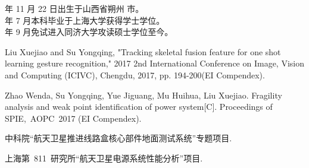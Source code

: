  年 11 月 22 日出生于山西省朔州 市。\\
 年 7 月本科毕业于上海大学获得学士学位。\\
 年 9 月免试进入同济大学攻读硕士学位至今。

\begin{enumerate}[{[}1{]}]

\item Liu Xuejiao and Su Yongqing, "Tracking skeletal fusion feature for one shot learning gesture recognition," 2017 2nd International Conference on Image, Vision and Computing (ICIVC), Chengdu, 2017, pp. 194-200(EI Compendex).
\item Zhao Wenda, Su Yongqing, Yue Jiguang, Mu Huihua, Liu Xuejiao. Fragility analysis and weak point identification of power system[C]. Proceedings of SPIE,~AOPC~2017 (EI Compendex).
\end{enumerate}


\begin{enumerate}[{[}1{]}]
\item 中科院“航天卫星推进线路盒核心部件地面测试系统”专题项目.
\item 上海第~811~研究所“航天卫星电源系统性能分析”项目.
\end{enumerate}
